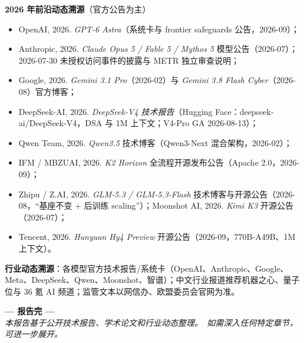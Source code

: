 \documentclass[12pt,a4paper]{article}
\begin{document}
\textbf{2026 年前沿动态溯源}（官方公告为主）
\begin{itemize}
  \item OpenAI, 2026. \emph{GPT-6 Astra}（系统卡与 frontier safeguards 公告，2026-09）；
  \item Anthropic, 2026. \emph{Claude Opus 5 / Fable 5 / Mythos 5} 模型公告（2026-07）；2026-07-30 未授权访问事件的披露与 METR 独立审查说明；
  \item Google, 2026. \emph{Gemini 3.1 Pro}（2026-02）与 \emph{Gemini 3.8 Flash Cyber}（2026-08）官方博客；
  \item DeepSeek-AI, 2026. \emph{DeepSeek-V4 技术报告}（Hugging Face：deepseek-ai/DeepSeek-V4，DSA 与 1M 上下文；V4-Pro GA 2026-08-13）；
  \item Qwen Team, 2026. \emph{Qwen3.5} 技术博客（Qwen3-Next 混合架构，2026-02）；
  \item IFM / MBZUAI, 2026. \emph{K2 Horizon} 全流程开源发布公告（Apache 2.0，2026-09）；
  \item Zhipu / Z.AI, 2026. \emph{GLM-5.3 / GLM-5.3-Flash} 技术博客与开源公告（2026-08，“基座不变 + 后训练 scaling”）；Moonshot AI, 2026. \emph{Kimi K3} 开源公告（2026-07）；
  \item Tencent, 2026. \emph{Hunyuan Hy4 Preview} 开源公告（2026-09，770B-A49B、1M 上下文）。
\end{itemize}

\textbf{行业动态溯源}：各模型官方技术报告/系统卡（OpenAI、Anthropic、Google、Meta、DeepSeek、Qwen、Moonshot、智谱）；中文行业报道推荐机器之心、量子位与 36 氪 AI 频道；监管文本以网信办、欧盟委员会官网为准。

\vfill
\begin{center}
\large\textbf{--- 报告完 ---}\\[0.5cm]
{\small\itshape 本报告基于公开技术报告、学术论文和行业动态整理。\ 如需深入任何特定章节，可进一步展开。}
\end{center}
\end{document}
